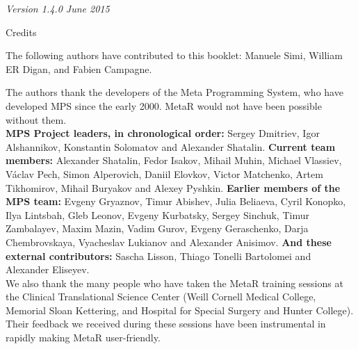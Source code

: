 \documentclass[11pt,fleqn]{book} %
\begin{document}
\noindent \textit{Version 1.4.0 June 2015}

{\newpage\thispagestyle{empty}\hbox{}}

\newpage\thispagestyle{empty}
\begin{empty}
\begin{center}\Large{Credits}\end{center}
\normalsize 


The following authors have contributed to this booklet: Manuele Simi, William ER Digan, and Fabien Campagne.


The authors thank the developers of the Meta Programming System, who have developed MPS since the early 2000. MetaR would not have been possible without them. \\
\noindent\textbf{MPS Project leaders, in chronological order:}  Sergey Dmitriev,  Igor Alshannikov, Konstantin Solomatov and Alexander Shatalin. \textbf{Current team members:} Alexander Shatalin, Fedor Isakov, Mihail Muhin, Michael Vlassiev, Václav Pech, Simon Alperovich, Daniil Elovkov, Victor Matchenko, Artem Tikhomirov, Mihail Buryakov and Alexey Pyshkin. \textbf{Earlier members of the MPS team:} Evgeny Gryaznov, Timur Abishev, Julia Beliaeva, Cyril Konopko, Ilya Lintsbah, Gleb Leonov, Evgeny Kurbatsky, Sergey Sinchuk, Timur Zambalayev, Maxim Mazin, Vadim Gurov, Evgeny Geraschenko, Darja Chembrovskaya, Vyacheslav Lukianov and Alexander Anisimov. \textbf{And these external contributors:}  Sascha Lisson, Thiago Tonelli Bartolomei and Alexander Eliseyev.\\

We also thank the many people who have taken the MetaR training sessions at the Clinical Translational Science Center (Weill Cornell Medical College, Memorial Sloan Kettering, and Hospital for Special Surgery and Hunter College). Their feedback we received during these sessions have been instrumental in rapidly making MetaR user-friendly.\\

\end{empty}

{\newpage\thispagestyle{empty}\hbox{}}
\end{document}
